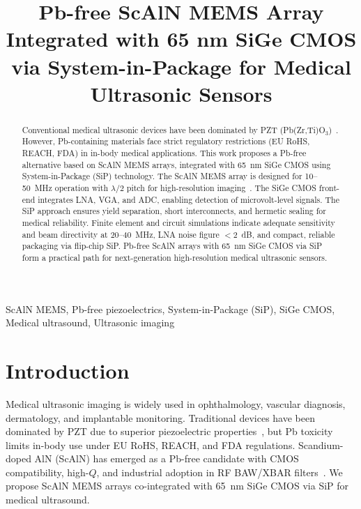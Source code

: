 \documentclass[conference]{IEEEtran}
\begin{document}
\title{Pb-free ScAlN MEMS Array Integrated with 65 nm SiGe CMOS via System-in-Package for Medical Ultrasonic Sensors}

\author{
}

\maketitle

\begin{abstract}
Conventional medical ultrasonic devices have been dominated by PZT (Pb(Zr,Ti)O$_3$)~\cite{akata2009pzt}. However, Pb-containing materials face strict regulatory restrictions (EU RoHS, REACH, FDA) in in-body medical applications. This work proposes a Pb-free alternative based on ScAlN MEMS arrays, integrated with 65~nm SiGe CMOS using System-in-Package (SiP) technology.
The ScAlN MEMS array is designed for 10--50~MHz operation with $\lambda/2$ pitch for high-resolution imaging~\cite{akrout2018scaln}. The SiGe CMOS front-end integrates LNA, VGA, and ADC, enabling detection of microvolt-level signals. The SiP approach ensures yield separation, short interconnects, and hermetic sealing for medical reliability. Finite element and circuit simulations indicate adequate sensitivity and beam directivity at 20--40~MHz, LNA noise figure $<2$~dB, and compact, reliable packaging via flip-chip SiP. Pb-free ScAlN arrays with 65~nm SiGe CMOS via SiP form a practical path for next-generation high-resolution medical ultrasonic sensors.
\end{abstract}

\begin{IEEEkeywords}
ScAlN MEMS, Pb-free piezoelectrics, System-in-Package (SiP), SiGe CMOS, Medical ultrasound, Ultrasonic imaging
\end{IEEEkeywords}

\section{Introduction}
Medical ultrasonic imaging is widely used in ophthalmology, vascular diagnosis, dermatology, and implantable monitoring. Traditional devices have been dominated by PZT due to superior piezoelectric properties~\cite{akata2009pzt}, but Pb toxicity limits in-body use under EU RoHS, REACH, and FDA regulations. Scandium-doped AlN (ScAlN) has emerged as a Pb-free candidate with CMOS compatibility, high-$Q$, and industrial adoption in RF BAW/XBAR filters~\cite{akrout2018scaln}. We propose ScAlN MEMS arrays co-integrated with 65~nm SiGe CMOS via SiP for medical ultrasound.
\end{document}
